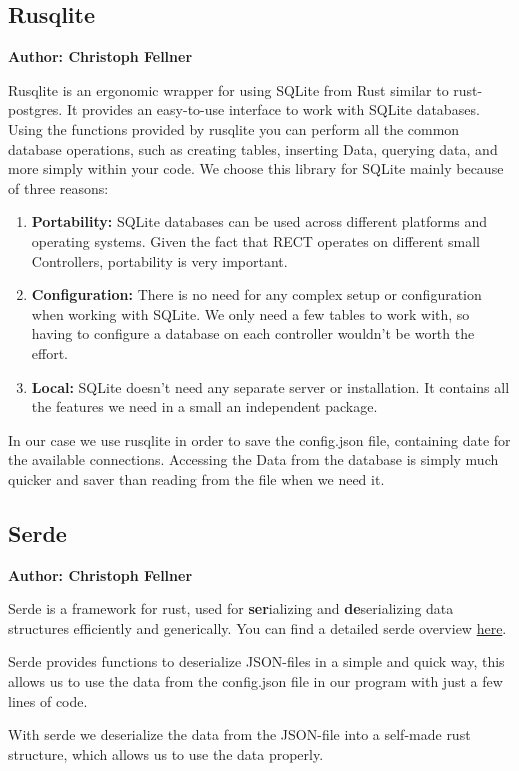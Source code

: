 \subsection{Rusqlite}
\textbf{Author: Christoph Fellner}

Rusqlite is an ergonomic wrapper for using SQLite from Rust similar to rust-postgres. It provides an easy-to-use interface to work with SQLite databases. Using the functions provided by rusqlite you can perform all the common database operations, such as creating tables, inserting Data, querying data, and more simply within your code. 
We choose this library for SQLite mainly because of three reasons:
\begin{enumerate}
    \item \textbf{Portability:} SQLite databases can be used across different platforms and operating systems. Given the fact that RECT operates on different small Controllers, portability is very important.
    \item \textbf{Configuration:} There is no need for any complex setup or configuration when working with SQLite. We only need a few tables to work with, so having to configure a database on each controller wouldn't be worth the effort.
    \item \textbf{Local:} SQLite doesn't need any separate server or installation. It contains all the features we need in a small an independent package.
\end{enumerate}

In our case we use rusqlite in order to save the config.json file, containing date for the available connections. Accessing the Data from the database is simply much quicker and saver than reading from the file when we need it. 

\subsection{Serde}
\textbf{Author: Christoph Fellner}

Serde is a framework for rust, used for \textbf{ser}ializing and \textbf{de}serializing data structures efficiently and generically. You can find a detailed serde overview \href{https://serde.rs/}{here}.

Serde provides functions to deserialize JSON-files in a simple and quick way, this allows us to use the data from the config.json file in our program with just a few lines of code.

With serde we deserialize the data from the JSON-file into a self-made rust structure, which allows us to use the data properly.  

